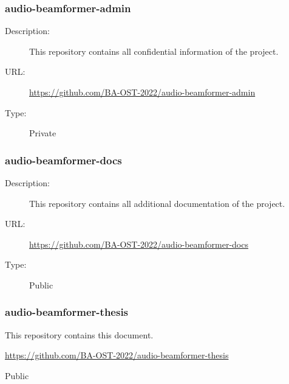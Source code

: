 \subsubsection{audio-beamformer-admin} \label{fleet-monitor-admin} \vspace{-0.2cm}
\begin{description}
	\item[Description:] This repository contains all confidential information of the project.\vspace{-0.25cm}
	\item[URL:] \url{https://github.com/BA-OST-2022/audio-beamformer-admin}\vspace{-0.25cm}
	\item[Type:] Private\vspace{-0.25cm}
\end{description}

\subsubsection{audio-beamformer-docs} \vspace{-0.2cm}
\begin{description}
	\item[Description:] This repository contains all additional documentation of the project.\vspace{-0.25cm}
	\item[URL:] \url{https://github.com/BA-OST-2022/audio-beamformer-docs}\vspace{-0.25cm}
	\item[Type:] Public\vspace{-0.25cm}
\end{description}

\subsubsection{audio-beamformer-thesis} \vspace{-0.2cm}
\begin{description}
	\hfuzz=35.0pt
	\item[Description:] This repository contains this document.\vspace{-0.25cm}
	\item[URL:] \url{https://github.com/BA-OST-2022/audio-beamformer-thesis}\vspace{-0.25cm}
	\item[Type:] Public\vspace{-0.25cm}
\end{description}

